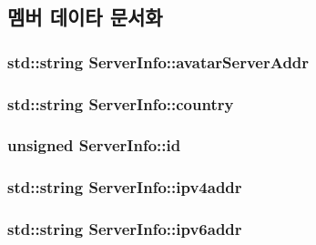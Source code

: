 \subsection{멤버 데이타 문서화}
\hypertarget{struct_server_info_ab880c1acf33d44c50edb68df6226782d}{
\subsubsection[{avatar\-Server\-Addr}]{\setlength{\rightskip}{0pt plus 5cm}std\-::string Server\-Info\-::avatar\-Server\-Addr}}\label{struct_server_info_ab880c1acf33d44c50edb68df6226782d}
\hypertarget{struct_server_info_a7c58f400c3f76c6c61d7455276943125}{
\subsubsection[{country}]{\setlength{\rightskip}{0pt plus 5cm}std\-::string Server\-Info\-::country}}\label{struct_server_info_a7c58f400c3f76c6c61d7455276943125}
\hypertarget{struct_server_info_a016372aebe04fe8ddf9d17b8977c0805}{
\subsubsection[{id}]{\setlength{\rightskip}{0pt plus 5cm}unsigned Server\-Info\-::id}}\label{struct_server_info_a016372aebe04fe8ddf9d17b8977c0805}
\hypertarget{struct_server_info_af0fafe5df3594c377aa38b4f32adcd0f}{
\subsubsection[{ipv4addr}]{\setlength{\rightskip}{0pt plus 5cm}std\-::string Server\-Info\-::ipv4addr}}\label{struct_server_info_af0fafe5df3594c377aa38b4f32adcd0f}
\hypertarget{struct_server_info_ae37d24d79649b567857dd9765b7dba6d}{
\subsubsection[{ipv6addr}]{\setlength{\rightskip}{0pt plus 5cm}std\-::string Server\-Info\-::ipv6addr}}\label{struct_server_info_ae37d24d79649b567857dd9765b7dba6d}
